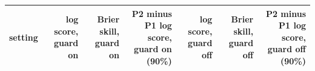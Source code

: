 \begin{tabular}{lrrrrrr}
\toprule
setting & log score, guard on & Brier skill, guard on & P2 minus P1 log score, guard on (90\%) & log score, guard off & Brier skill, guard off & P2 minus P1 log score, guard off (90\%) \\
\midrule
\bottomrule
\end{tabular}
